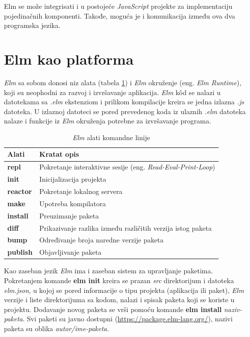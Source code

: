 \documentclass[12pt,oneside]{memoir}
\begin{document}
Elm se može integrisati i u postojeće \emph{JavaScript} projekte za implementaciju pojedinačnih 
komponenti. Takođe, moguća je i komunikacija između ova dva programska jezika. 

\section{Elm kao platforma}
\emph{Elm} sa sobom donosi niz alata (tabela \ref{table:elmTools}) i \emph{Elm} okruženje (eng. \emph{Elm 
Runtime}), koji su neophodni za razvoj i izvršavanje aplikacija. \emph{Elm} k\^{o}d se nalazi u 
datotekama sa \emph{.elm} ekstenziom i prilikom kompilacije kreira se jedna izlazna 
\emph{.js} datoteka. U izlaznoj datoteci se pored prevedenog koda iz ulaznih \emph{.elm} 
datoteka nalaze i funkcije iz \emph{Elm} okruženja potrebne za izvršavanje programa.

\begin{table}[h!]
\centering
\begin{tabular}{|l l|} 
 \hline 
 Alati & Kratat opis  \\ [0.5ex] 
 \hline
  \textbf{repl} & Pokretanje interaktivne sesije (eng. \emph{Read-Eval-Print-Loop}) \\ 
  \textbf{init} & Inicijalizacija projekta \\
  \textbf{reactor} & Pokretanje lokalnog servera \\
  \textbf{make} & Upotreba kompilatora \\
  \textbf{install}  & Preuzimanje paketa \\ 
  \textbf{diff} & Prikazivanje razlika između različitih verzija istog paketa \\
  \textbf{bump} & Određivanje broja naredne verzije paketa  \\
  \textbf{publish} & Objavljivanje paketa \\[1ex] 
 \hline
\end{tabular}
\caption{\emph{Elm} alati komandne linije}
\label{table:elmTools}
\end{table}

 
Kao zaseban jezik \emph{Elm} ima i zaseban sistem za upravljanje paketima.
Pokretanjem komande \textbf{elm init} kreira se prazan \emph{src} direktorijum i 
datoteka \emph{elm.json}, u kojoj se pored informacije o tipu projekta (aplikacija ili 
paket), \emph{Elm} verzije i liste direktorijuma sa kodom, nalazi i spisak paketa koji se 
koriste u projektu. Dodavanje novog paketa se vrši pomoću komande \textbf{elm install} 
\emph{naziv-paketa}. Svi paketi su javno dostupni (\url{https://package.elm-lang.org/}),
nazivi paketa su oblika \emph{autor/ime-paketa}.
\end{document}
